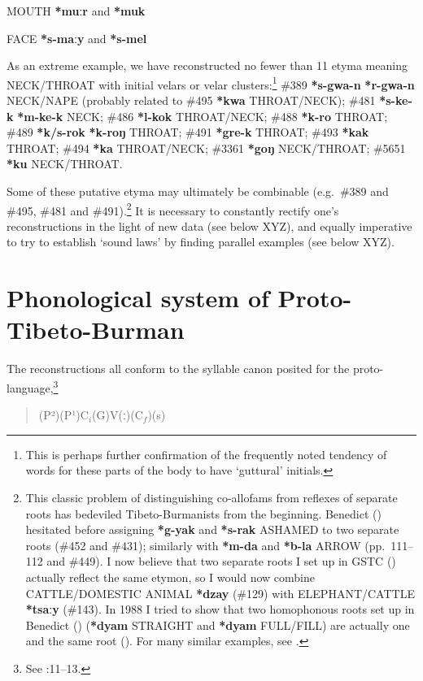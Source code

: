 MOUTH \textbf{*muːr} and \textbf{*muk}

FACE \textbf{*s-maːy} and \textbf{*s-mel}

As an extreme example, we have reconstructed no fewer than 11 etyma meaning NECK/THROAT with initial velars or velar clusters:\footnote{This is perhaps further confirmation of the frequently noted tendency of words for these parts of the body to have ‘guttural’ initials.} \#389 \textbf{*s-gwa-n}  \textbf{*r-gwa-n} NECK/NAPE (probably related to \#495 \textbf{*kwa} THROAT/NECK); \#481 \textbf{*s-ke-k}  \textbf{*m-ke-k} NECK; \#486 \textbf{*l-kok} THROAT/NECK; \#488 \textbf{*k-ro} THROAT; \#489 \textbf{*k/s-rok}  \textbf{*k-roŋ} THROAT; \#491 \textbf{*gre-k} THROAT; \#493 \textbf{*kak} THROAT; \#494 \textbf{*ka} THROAT/NECK; \#3361 \textbf{*goŋ} NECK/THROAT; \#5651 \textbf{*ku} NECK/THROAT.

Some of these putative etyma may ultimately be combinable (e.g.\ \#389 and \#495, \#481 and \#491).\footnote{This classic problem of distinguishing co-allofams from reflexes of separate roots has bedeviled Tibeto-Burmanists from the beginning. Benedict (\textit{}) hesitated before assigning \textbf{*g-yak} and \textbf{*s-rak} ASHAMED to two separate roots (\#452 and \#431); similarly with \textbf{*m-da} and \textbf{*b-la} ARROW (pp.~111–112 and \#449). I now believe that two separate roots I set up in GSTC (\citealt{JAM-GSTC}) actually reflect the same etymon, so I would now combine CATTLE/DOMESTIC ANIMAL \textbf{*dzay} (\#129) with ELEPHANT/CATTLE \textbf{*tsaːy} (\#143). In 1988 I tried to show that two homophonous roots set up in Benedict (\textit{}) (\textbf{*dyam} STRAIGHT and \textbf{*dyam} FULL/FILL) are actually one and the same root (\citealt{JAM-USAI}). For many similar examples, see \citealt{JAM-RGPJ}.} It is necessary to constantly rectify one’s reconstructions in the light of new data (see below XYZ), and equally imperative to try to establish ‘sound laws’ by finding parallel examples (see below XYZ).

\section{Phonological system of Proto-Tibeto-Burman}


The reconstructions all conform to the syllable canon posited for the
proto-language,\footnote{See \textit{}:11–13.}

\begin{quote}
(P²)\hspace{2em}(P¹)\hspace{2em}$\textrm{C}_i$\hspace{2em}(G)\hspace{2em}V\hspace{2em}(ː)\hspace{2em}($\textrm{C}_f$)\hspace{2em}(s)
\end{quote}
	

